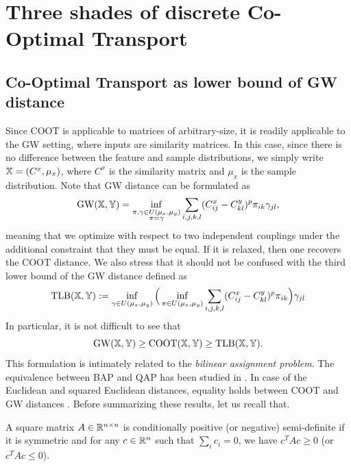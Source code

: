 \section{Three shades of discrete Co-Optimal Transport}

\subsection{Co-Optimal Transport as lower bound of GW distance} \label{subsec:GWLB}

Since COOT is applicable to matrices of arbitrary-size, it is readily applicable to the GW setting,
where inputs are similarity matrices. In this case, since there is no difference between
the feature and sample distributions, we simply write $\mathbb X = (C^x, \mu_x)$,
where $C^x$ is the similarity matrix and $\mu_x$ is the sample distribution.
Note that GW distance can be formulated as
\begin{align}
  \text{GW}(\mathbb X, \mathbb Y) =
  \inf_{\substack{\pi, \gamma \in U(\mu_x, \mu_y) \\ \pi = \gamma }}
  \sum_{i,j,k,l} (C^x_{ij} - C^y_{kl})^p \pi_{ik} \gamma_{jl},
\end{align}
meaning that we optimize with respect to two independent couplings
under the additional constraint that they must be equal. If it is relaxed, then
one recovers the COOT distance. We also stress that it should not
be confused with the third lower bound of the GW distance \citep{Memoli07,Memoli11} defined as
\begin{equation}
  \text{TLB}(\mathbb X, \mathbb Y) :=
  \inf_{\gamma \in U(\mu_x, \mu_y)}
  \Big( \inf_{\pi \in U(\mu_x, \mu_y)} \sum_{i,j,k,l} (C^x_{ij} - C^y_{kl})^p \pi_{ik}
  \Big) \gamma_{jl}
\end{equation}
In particular, it is not difficult to see that
\begin{equation}
  \label{gw_tlb_COOT}
  \text{GW}(\mathbb X, \mathbb Y) \geq \text{COOT}(\mathbb X, \mathbb Y)
  \geq \text{TLB}(\mathbb X, \mathbb Y).
\end{equation}
This formulation is intimately related to the \textit{bilinear assignment problem}.
The equivalence between BAP and QAP has been studied in \citep{Konno76}.
In case of the Euclidean and squared Euclidean distances, equality holds between
COOT and GW distances \citep{Sejourne20,Redko20}. Before summarizing these results,
let us recall that.
\begin{definition}
   A square matrix $A \in \mathbb R^{n \times n}$ is
  conditionally positive (or negative) semi-definite
  if it is symmetric and for any $c \in \mathbb R^n$ such that $\sum_i c_i = 0$, we have
  $c^T A c \geq 0$ (or $c^T A c \leq 0$).
\end{definition}
